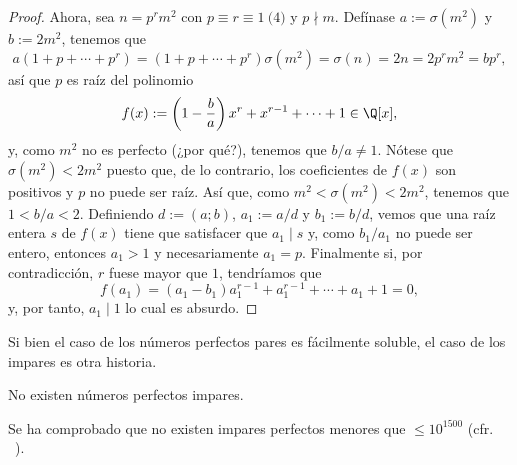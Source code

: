 \documentclass[teoria-numeros.tex]{subfiles}
\begin{document}
\begin{proof}
	Ahora, sea $n = p^r m^2$ con $p \equiv r \equiv 1 \pod{4}$ y $p \nmid m$.
	Defínase $a := \sigma(m^2)$ y $b := 2m^2$, tenemos que
	$$ a(1 + p + \cdots + p^r) = (1 + p + \cdots + p^r) \sigma(m^2) = \sigma(n) = 2n = 2p^r m^2 = b p^r, $$
	así que $p$ es raíz del polinomio
	\[
		f(x) := \left(1 - \frac{b}{a}\right) x^r + x^{r-1} + \cdots + 1 \in \Q[x],
	\]
	y, como $m^2$ no es perfecto (¿por qué?), tenemos que $b/a \ne 1$.
	Nótese que $\sigma(m^2) < 2m^2$ puesto que, de lo contrario, los coeficientes de $f(x)$ son positivos y $p$ no puede ser raíz.
	Así que, como $m^2 < \sigma(m^2) < 2m^2$, tenemos que $1 < b/a < 2$.
	Definiendo $d := (a; b)$, $a_1 := a/d$ y $b_1 := b/d$, vemos que una raíz entera $s$ de $f(x)$ tiene que satisfacer que $a_1 \mid s$ y,
	como $b_1/a_1$ no puede ser entero, entonces $a_1 > 1$ y necesariamente $a_1 = p$.
	Finalmente si, por contradicción, $r$ fuese mayor que $1$, tendríamos que
	$$ f(a_1) = (a_1 - b_1)a_1^{r-1} + a_1^{r-1} + \cdots + a_1 + 1 = 0, $$
	y, por tanto, $a_1 \mid 1$ lo cual es absurdo.
\end{proof}

Si bien el caso de los números perfectos pares es fácilmente soluble, el caso de los impares es otra historia.
\begin{con}
	No existen números perfectos impares.
\end{con}
Se ha comprobado que no existen impares perfectos menores que $\le 10^{1500}$ (cfr. \citeauthor{ochem2012perfect}~\cite{ochem2012perfect}).

\end{document}
